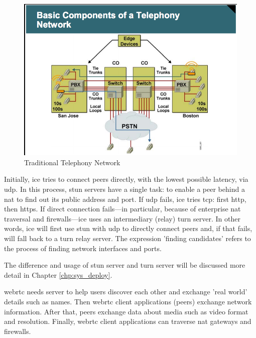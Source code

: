 \begin{figure}
	\centering
    	\includegraphics[height=0.40\textheight,natwidth=610,natheight=642]{figs/telephony_network.png}
  	\caption{Traditional Telephony Network}
  	\label{fig:telephony_network}
\end{figure}

\par Initially, \gls{ice} tries to connect peers directly, with the lowest possible latency, via \gls{udp}. In this process, \gls{stun} servers have a single task: to enable a peer behind a \gls{nat} to find out its public address and port. If \gls{udp} fails, \gls{ice} tries \gls{tcp}: first \gls{http}, then \gls{https}. If direct connection fails—in particular, because of enterprise \gls{nat} traversal and firewalls—\gls{ice} uses an intermediary (relay) \gls{turn} server. In other words, \gls{ice} will first use \gls{stun} with \gls{udp} to directly connect peers and, if that fails, will fall back to a \gls{turn} relay server. The expression 'finding candidates' refers to the process of finding network interfaces and ports.\cite{html5rock:webrtc}

\par The difference and usage of \gls{stun} server and \gls{turn} server will be discussed more detail in Chapter \ref{chp:sys_deploy}.

\par \gls{webrtc} needs server to help users discover each other and exchange 'real world' details such as names. Then \gls{webrtc} client applications (peers) exchange network information. After that, peers exchange data about media such as video format and resolution. Finally, \gls{webrtc} client applications can traverse \gls{nat} gateways and firewalls.

